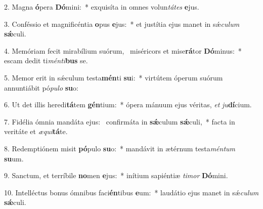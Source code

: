 2. Magna \textbf{ó}pera \textbf{Dó}mini:~*  exquisíta in omnes volun\textit{tá}\textit{tes} \textbf{e}jus.\

3. Conféssio et magnificéntia \textbf{o}pus \textbf{e}jus:~*  et justítia ejus manet in sǽ\textit{cu}\textit{lum} \textbf{sǽ}culi.\

4. Memóriam fecit mirabílium suórum, \dag\  miséricors et mise\textbf{rá}tor \textbf{Dó}minus:~*  escam dedit ti\textit{mén}\textit{ti}\textbf{bus} se.\

5. Memor erit in sǽculum testa\textbf{mén}ti \textbf{su}i:~*  virtútem óperum suórum annuntiábit pó\textit{pu}\textit{lo} \textbf{su}o:\

6. Ut det illis heredi\textbf{tá}tem \textbf{gén}tium:~*  ópera mánuum ejus véritas, \textit{et} \textit{ju}\textbf{dí}cium.\

7. Fidélia ómnia mandáta ejus: \dag\  confirmáta in \textbf{sǽ}culum \textbf{sǽ}culi,~*  facta in veritáte et \textit{æ}\textit{qui}\textbf{tá}te.\

8. Redemptiónem misit \textbf{pó}pulo \textbf{su}o:~*  mandávit in ætérnum testa\textit{mén}\textit{tum} \textbf{su}um.\

9. Sanctum, et terríbile \textbf{no}men \textbf{e}jus:~*  inítium sapiéntiæ \textit{ti}\textit{mor} \textbf{Dó}mini.\

10. Intelléctus bonus ómnibus faci\textbf{én}tibus \textbf{e}um:~*  laudátio ejus manet in sǽ\textit{cu}\textit{lum} \textbf{sǽ}culi.\


